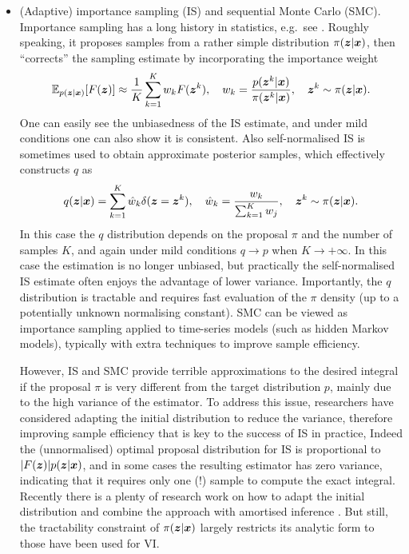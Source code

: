 \begin{itemize}
\item (Adaptive) importance sampling (IS) and sequential Monte Carlo (SMC). \\
Importance sampling has a long history in statistics, e.g.~see \cite{geweke:mc1989}. Roughly speaking, it proposes samples from a rather simple distribution $\pi(\bm{z} | \bm{x})$, then ``corrects'' the sampling estimate by incorporating the importance weight
\begin{equation}
\mathbb{E}_{p(\bm{z}|\bm{x})}[F(\bm{z})] \approx \frac{1}{K} \sum_{k=1}^K w_k F(\bm{z}^k), \quad w_k = \frac{p(\bm{z}^k | \bm{x})}{\pi(\bm{z}^k | \bm{x})}, \quad \bm{z}^k \sim \pi(\bm{z} | \bm{x}).
\label{eq:chap5_is_estimator}
\end{equation}
One can easily see the unbiasedness of the IS estimate, and under mild conditions one can also show it is consistent. Also self-normalised IS is sometimes used to obtain approximate posterior samples, which effectively constructs $q$ as 
\begin{equation}
q(\bm{z} | \bm{x}) = \sum_{k=1}^K \hat{w}_k \delta(\bm{z} = \bm{z}^k), \quad \hat{w}_k = \frac{w_k}{\sum_{k=1}^K w_j}, \quad \bm{z}^k \sim \pi(\bm{z} | \bm{x}).
\end{equation}
In this case the $q$ distribution depends on the proposal $\pi$ and the number of samples $K$, and again under mild conditions $q \rightarrow p$ when $K \rightarrow +\infty$. In this case the estimation is no longer unbiased, but practically the self-normalised IS estimate often enjoys the advantage of lower variance. Importantly, the $q$ distribution is tractable and requires fast evaluation of the $\pi$ density (up to a potentially unknown normalising constant). SMC can be viewed as importance sampling applied to time-series models (such as hidden Markov models), typically with extra techniques to improve sample efficiency.

However, IS and SMC provide terrible approximations to the desired integral if the proposal $\pi$ is very different from the target distribution $p$, mainly due to the high variance of the estimator. To address this issue, researchers have considered adapting the initial distribution to reduce the variance, therefore improving sample efficiency that is key to the success of IS in practice, Indeed the (unnormalised) optimal proposal distribution for IS is proportional to $| F(\bm{z}) | p(\bm{z} | \bm{x})$, and in some cases the resulting estimator has zero variance, indicating that it requires only one (!) sample to compute the exact integral. Recently there is a plenty of research work on how to adapt the initial distribution and combine the approach with amortised inference \citep{cornebise:smc2009, gu:nasmc2015, burda:iwae2016, paige:smc2016, le:aesmc2017, naesseth:vsmc2017, maddison:fivo2017}. But still, the tractability constraint of $\pi(\bm{z} | \bm{x})$ largely restricts its analytic form to those have been used for VI.


\end{itemize}
